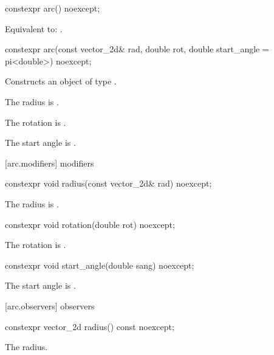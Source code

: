 %
\begin{itemdecl}
constexpr arc() noexcept;
\end{itemdecl}
\begin{itemdescr}
\pnum
\effects
Equivalent to: .
\end{itemdescr}

%
\begin{itemdecl}
constexpr arc(const vector_2d& rad, double rot,
  double start_angle = pi<double>) noexcept;
\end{itemdecl}
\begin{itemdescr}
\pnum
\effects
Constructs an object of type .

\pnum
The radius is .

\pnum
The rotation is .

\pnum
The start angle is .
\end{itemdescr}

 [arc.modifiers]{ modifiers}%

%
\begin{itemdecl}
constexpr void radius(const vector_2d& rad) noexcept;
\end{itemdecl}
\begin{itemdescr}
\pnum
\effects
The radius is .
\end{itemdescr}

%
\begin{itemdecl}
constexpr void rotation(double rot) noexcept;
\end{itemdecl}
\begin{itemdescr}
\pnum
\effects
The rotation is .
\end{itemdescr}

%
\begin{itemdecl}
constexpr void start_angle(double sang) noexcept;
\end{itemdecl}
\begin{itemdescr}
\pnum
\effects
The start angle is .
\end{itemdescr}

 [arc.observers]{ observers}%

%
\begin{itemdecl}
constexpr vector_2d radius() const noexcept;
\end{itemdecl}
\begin{itemdescr}
\pnum
\returns
The radius.
\end{itemdescr}


